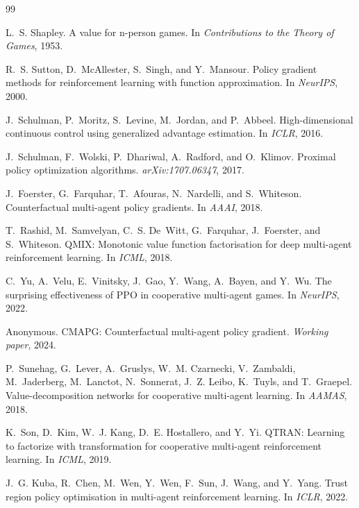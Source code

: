 \documentclass[11pt,a4paper]{article}
\begin{document}
\begin{thebibliography}{99}

L.~S. Shapley.
\newblock A value for n-person games.
\newblock In \emph{Contributions to the Theory of Games}, 1953.

R.~S. Sutton, D.~McAllester, S.~Singh, and Y.~Mansour.
\newblock Policy gradient methods for reinforcement learning with function approximation.
\newblock In \emph{NeurIPS}, 2000.

J.~Schulman, P.~Moritz, S.~Levine, M.~Jordan, and P.~Abbeel.
\newblock High-dimensional continuous control using generalized advantage estimation.
\newblock In \emph{ICLR}, 2016.

J.~Schulman, F.~Wolski, P.~Dhariwal, A.~Radford, and O.~Klimov.
\newblock Proximal policy optimization algorithms.
\newblock \emph{arXiv:1707.06347}, 2017.

J.~Foerster, G.~Farquhar, T.~Afouras, N.~Nardelli, and S.~Whiteson.
\newblock Counterfactual multi-agent policy gradients.
\newblock In \emph{AAAI}, 2018.

T.~Rashid, M.~Samvelyan, C.~S. De~Witt, G.~Farquhar, J.~Foerster, and S.~Whiteson.
\newblock QMIX: Monotonic value function factorisation for deep multi-agent reinforcement learning.
\newblock In \emph{ICML}, 2018.

C.~Yu, A.~Velu, E.~Vinitsky, J.~Gao, Y.~Wang, A.~Bayen, and Y.~Wu.
\newblock The surprising effectiveness of PPO in cooperative multi-agent games.
\newblock In \emph{NeurIPS}, 2022.

Anonymous.
\newblock CMAPG: Counterfactual multi-agent policy gradient.
\newblock \emph{Working paper}, 2024.

P.~Sunehag, G.~Lever, A.~Gruslys, W.~M. Czarnecki, V.~Zambaldi, M.~Jaderberg, M.~Lanctot, N.~Sonnerat, J.~Z. Leibo, K.~Tuyls, and T.~Graepel.
\newblock Value-decomposition networks for cooperative multi-agent learning.
\newblock In \emph{AAMAS}, 2018.

K.~Son, D.~Kim, W.~J. Kang, D.~E. Hostallero, and Y.~Yi.
\newblock QTRAN: Learning to factorize with transformation for cooperative multi-agent reinforcement learning.
\newblock In \emph{ICML}, 2019.

J.~G. Kuba, R.~Chen, M.~Wen, Y.~Wen, F.~Sun, J.~Wang, and Y.~Yang.
\newblock Trust region policy optimisation in multi-agent reinforcement learning.
\newblock In \emph{ICLR}, 2022.


\end{thebibliography}
\end{document}
